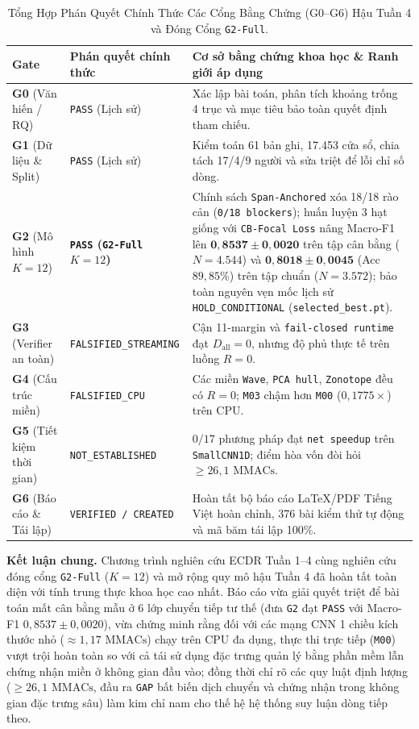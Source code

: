 \documentclass[11pt,a4paper]{article}
\newcommand{\code}[1]{{\small\ttfamily\nolinkurl{#1}}}
\theoremstyle{remark}
\begin{document}
\begin{table}[!htbp]
\centering\small
\caption{Tổng Hợp Phán Quyết Chính Thức Các Cổng Bằng Chứng (G0--G6) Hậu Tuần 4 và Đóng Cổng \code{G2-Full}.}
\label{tab:gates_vi}
\begin{tabularx}{\linewidth}{@{}llY@{}}
\toprule
\textbf{Gate} & \textbf{Phán quyết chính thức} & \textbf{Cơ sở bằng chứng khoa học \& Ranh giới áp dụng} \\
\midrule
\textbf{G0} (Văn hiến / RQ) & \code{PASS} (Lịch sử) & Xác lập bài toán, phân tích khoảng trống 4 trục và mục tiêu bảo toàn quyết định tham chiếu. \\
\textbf{G1} (Dữ liệu \& Split) & \code{PASS} (Lịch sử) & Kiểm toán 61 bản ghi, 17.453 cửa sổ, chia tách 17/4/9 người và sửa triệt để lỗi chỉ số dòng. \\
\textbf{G2} (Mô hình $K=12$) & \textbf{\code{PASS} (\code{G2-Full} $K=12$)} & Chính sách \code{Span-Anchored} xóa 18/18 rào cản (\code{0/18 blockers}); huấn luyện 3 hạt giống với \code{CB-Focal Loss} nâng Macro-F1 lên $\mathbf{0,8537 \pm 0,0020}$ trên tập cân bằng ($N=4.544$) và $\mathbf{0,8018 \pm 0,0045}$ (Acc $89,85\%$) trên tập chuẩn ($N=3.572$); bảo toàn nguyên vẹn mốc lịch sử \code{HOLD\_CONDITIONAL} (\code{selected\_best.pt}). \\
\textbf{G3} (Verifier an toàn) & \code{FALSIFIED\_STREAMING} & Cận 11-margin và \code{fail-closed runtime} đạt $D_{\text{all}}=0$, nhưng độ phủ thực tế trên luồng $R=0$. \\
\textbf{G4} (Cấu trúc miền) & \code{FALSIFIED\_CPU} & Các miền \code{Wave}, \code{PCA hull}, \code{Zonotope} đều có $R=0$; \code{M03} chậm hơn \code{M00} ($0,1775\times$) trên CPU. \\
\textbf{G5} (Tiết kiệm thời gian) & \code{NOT\_ESTABLISHED} & $0/17$ phương pháp đạt \code{net speedup} trên \code{SmallCNN1D}; điểm hòa vốn đòi hỏi $\ge 26,1\text{ MMACs}$. \\
\textbf{G6} (Báo cáo \& Tái lập) & \code{VERIFIED / CREATED} & Hoàn tất bộ báo cáo LaTeX/PDF Tiếng Việt hoàn chỉnh, 376 bài kiểm thử tự động và mã băm tái lập 100\%. \\
\bottomrule
\end{tabularx}
\end{table}

\textbf{Kết luận chung.} Chương trình nghiên cứu ECDR Tuần 1--4 cùng nghiên cứu đóng cổng \code{G2-Full} ($K=12$) và mở rộng quy mô hậu Tuần 4 đã hoàn tất toàn diện với tính trung thực khoa học cao nhất. Báo cáo vừa giải quyết triệt để bài toán mất cân bằng mẫu ở 6 lớp chuyển tiếp tư thế (đưa \code{G2} đạt \code{PASS} với Macro-F1 $0,8537 \pm 0,0020$), vừa chứng minh rằng đối với các mạng CNN 1 chiều kích thước nhỏ ($\approx 1,17\text{ MMACs}$) chạy trên CPU đa dụng, thực thi trực tiếp (\code{M00}) vượt trội hoàn toàn so với cả tái sử dụng đặc trưng quản lý bằng phần mềm lẫn chứng nhận miền ở không gian đầu vào; đồng thời chỉ rõ các quy luật định lượng ($\ge 26,1\text{ MMACs}$, đầu ra \code{GAP} bất biến dịch chuyển và chứng nhận trong không gian đặc trưng sâu) làm kim chỉ nam cho thế hệ hệ thống suy luận dòng tiếp theo.
\end{document}
